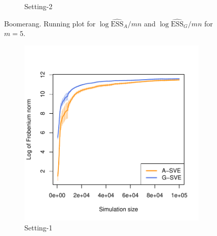 \documentclass[11pt]{article}
\theoremstyle{remark}
\begin{document}
\begin{figure}[h]
\begin{subfigure}[h]{.4\textwidth}
      \caption{Setting-2}
      \label{subfig:boom-ess2}
    \end{subfigure}
    \caption{Boomerang. Running plot for $\log \hat{\text{ESS}}_A/mn$ and $\log \hat{\text{ESS}}_G/mn$ for $m = 5$.}
    \label{fig:boom-ess}
\end{figure}



\begin{figure}[h]
    \centering
    
    \begin{subfigure}[h]{.4\textwidth}
      \centering
      \includegraphics[width = \textwidth]{plots/boom-frob_1_3_8_m5.pdf}
      \caption{Setting-1}
      \label{subfig:boom-frob1}
    \end{subfigure} \hspace{1cm}
    \begin{subfigure}[h]{.4\textwidth}
      \centering

\end{subfigure}
\end{figure}
\end{document}
